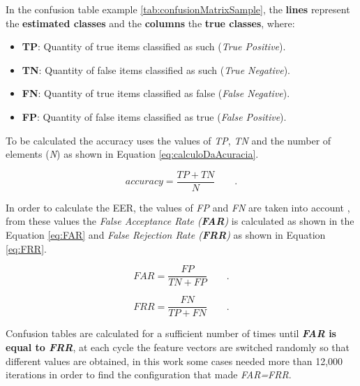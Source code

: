 		\par In the confusion table example \ref{tab:confusionMatrixSample}, the \textbf{lines} represent the \textbf{estimated classes} and the \textbf{columns} the \textbf{true classes}, where:

		\begin{itemize}
			\item \textbf{TP}: Quantity of true items classified as such (\textit{True Positive}).
			\item \textbf{TN}: Quantity of false items classified as such (\textit{True Negative}).
			\item \textbf{FN}: Quantity of true items classified as false (\textit{False Negative}).
			\item \textbf{FP}: Quantity of false items classified as true (\textit{False Positive}).
		\end{itemize}

		

		\par To be calculated the accuracy uses the values of \textit{TP}, \textit{TN} and the number of elements (\textit{N}) as shown in Equation \ref{eq:calculoDaAcuracia}.
		
		\begin{equation}
			accuracy = \dfrac{TP + TN}{N} \qquad.
			\label{eq:calculoDaAcuracia}
		\end{equation}

		\par In order to calculate the EER, the values of \textit{FP} and \textit{FN}  are taken into account \cite{ghazali2018recent}, from these values the \textit{False Acceptance Rate (\textbf{FAR})} is calculated as shown in the Equation \ref{eq:FAR} and \textit{False Rejection Rate (\textbf{FRR})} as shown in Equation \ref{eq:FRR}.

		\begin{equation}
			FAR=\dfrac{FP}{TN+FP} \qquad.
			\label{eq:FAR}
		\end{equation}
		
		\begin{equation}
			FRR=\dfrac{FN}{TP+FN} \qquad.
			\label{eq:FRR}
		\end{equation}

		\par Confusion tables are calculated for a sufficient number of times until \textbf{\textit{FAR} is equal to \textit{FRR}}, at each cycle the feature vectors are switched randomly so that different values are obtained, in this work some cases needed more than 12,000 iterations in order to find the configuration that made \textit{FAR=FRR}.

